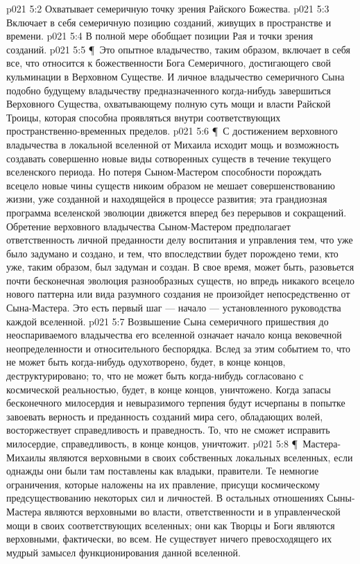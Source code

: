 \vs p021 5:2 \bibnobreakspace Охватывает семеричную точку зрения Райского Божества.
\vs p021 5:3 \bibnobreakspace Включает в себя семеричную позицию созданий, живущих в пространстве и времени.
\vs p021 5:4 \bibnobreakspace В полной мере обобщает позиции Рая и точки зрения созданий.
\vs p021 5:5 \P\ Это опытное владычество, таким образом, включает в себя все, что относится к божественности Бога Семеричного, достигающего свой кульминации в Верховном Существе. И личное владычество семеричного Сына подобно будущему владычеству предназначенного когда\hyp{}нибудь завершиться Верховного Существа, охватывающему полную суть мощи и власти Райской Троицы, которая способна проявляться внутри соответствующих пространственно\hyp{}временных пределов.
\vs p021 5:6 \P\ С достижением верховного владычества в локальной вселенной от Михаила исходит мощь и возможность создавать совершенно новые виды сотворенных существ в течение текущего вселенского периода. Но потеря Сыном\hyp{}Мастером способности порождать всецело новые чины существ никоим образом не мешает совершенствованию жизни, уже созданной и находящейся в процессе развития; эта грандиозная программа вселенской эволюции движется вперед без перерывов и сокращений. Обретение верховного владычества Сыном\hyp{}Мастером предполагает ответственность личной преданности делу воспитания и управления тем, что уже было задумано и создано, и тем, что впоследствии будет порождено теми, кто уже, таким образом, был задуман и создан. В свое время, может быть, разовьется почти бесконечная эволюция разнообразных существ, но впредь никакого всецело нового паттерна или вида разумного создания не произойдет непосредственно от Сына\hyp{}Мастера. Это есть первый шаг --- начало --- установленного руководства каждой вселенной.
\vs p021 5:7 Возвышение Сына семеричного пришествия до неоспариваемого владычества его вселенной означает начало конца вековечной неопределенности и относительного беспорядка. Вслед за этим событием то, что не может быть когда\hyp{}нибудь одухотворено, будет, в конце концов, деструктурировано; то, что не может быть когда\hyp{}нибудь согласовано с космической реальностью, будет, в конце концов, уничтожено. Когда запасы бесконечного милосердия и невыразимого терпения будут исчерпаны в попытке завоевать верность и преданность созданий мира сего, обладающих волей, восторжествует справедливость и праведность. То, что не сможет исправить милосердие, справедливость, в конце концов, уничтожит.
\vs p021 5:8 \P\ Мастера\hyp{}Михаилы являются верховными в своих собственных локальных вселенных, если однажды они были там поставлены как владыки, правители. Те немногие ограничения, которые наложены на их правление, присущи космическому предсуществованию некоторых сил и личностей. В остальных отношениях Сыны\hyp{}Мастера являются верховными во власти, ответственности и в управленческой мощи в своих соответствующих вселенных; они как Творцы и Боги являются верховными, фактически, во всем. Не существует ничего превосходящего их мудрый замысел функционирования данной вселенной.
